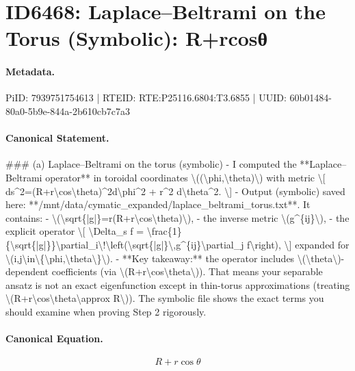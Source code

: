 \section*{ID6468: Laplace–Beltrami on the Torus (Symbolic): R+rcosθ}
\paragraph{Metadata.}
PiID: 7939751754613 | RTEID: RTE:P25116.6804:T3.6855 | UUID: 60b01484-80a0-5b9e-844a-2b610cb7c7a3

\paragraph{Canonical Statement.}
\#\#\# (a) Laplace–Beltrami on the torus (symbolic) - I computed the **Laplace–Beltrami operator** in toroidal coordinates \textbackslash{}((\textbackslash{}phi,\textbackslash{}theta)\textbackslash{}) with metric \textbackslash{}[ ds\textasciicircum{}2=(R+r\textbackslash{}cos\textbackslash{}theta)\textasciicircum{}2d\textbackslash{}phi\textasciicircum{}2 + r\textasciicircum{}2 d\textbackslash{}theta\textasciicircum{}2. \textbackslash{}] - Output (symbolic) saved here: **/mnt/data/cymatic\_expanded/laplace\_beltrami\_torus.txt**. It contains: - \textbackslash{}(\textbackslash{}sqrt\{|g|\}=r(R+r\textbackslash{}cos\textbackslash{}theta)\textbackslash{}), - the inverse metric \textbackslash{}(g\textasciicircum{}\{ij\}\textbackslash{}), - the explicit operator \textbackslash{}[ \textbackslash{}Delta\_s f = \textbackslash{}frac\{1\}\{\textbackslash{}sqrt\{|g|\}\}\textbackslash{}partial\_i\textbackslash{}!\textbackslash{}left(\textbackslash{}sqrt\{|g|\}\textbackslash{},g\textasciicircum{}\{ij\}\textbackslash{}partial\_j f\textbackslash{}right), \textbackslash{}] expanded for \textbackslash{}(i,j\textbackslash{}in\textbackslash{}\{\textbackslash{}phi,\textbackslash{}theta\textbackslash{}\}\textbackslash{}). - **Key takeaway:** the operator includes \textbackslash{}(\textbackslash{}theta\textbackslash{})-dependent coefficients (via \textbackslash{}(R+r\textbackslash{}cos\textbackslash{}theta\textbackslash{})). That means your separable ansatz is not an exact eigenfunction except in thin-torus approximations (treating \textbackslash{}(R+r\textbackslash{}cos\textbackslash{}theta\textbackslash{}approx R\textbackslash{})). The symbolic file shows the exact terms you should examine when proving Step 2 rigorously.

\paragraph{Canonical Equation.}
\[
R+r\cos\theta
\]

